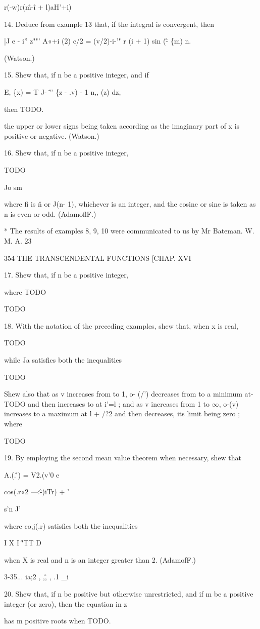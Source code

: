 r(-w)r(\^m-\^i + l)aH'+i)

14. Deduce from example 13 that, if the integral is convergent, then

|J e - i'' z""' A«+i (2) c/2 = (v/2)-i-'" r (i + 1) sin (\^ - \{m) n.

(Watson.)

15. Shew that, if n be a positive integer, and if

E, \{x) = T J- \^'' \{z - .v) - 1 n,, (z) dz,

then TODO.

the upper or lower signs being taken according as the imaginary part
of x is positive or negative. (Watson.)

16. Shew that, if n be a positive integer,

TODO

Jo sm

where fi is \^n or J(n- 1), whichever is an integer, and the cosine or
sine is taken as n is even or odd. (AdamoflF.)

* The results of examples 8, 9, 10 were communicated to us by Mr
Bateman. W. M. A. 23



354 THE TRANSCENDENTAL FUNCTIONS [CHAP. XVI

17. Shew that, if n be a positive integer,

where TODO

TODO 

18. With the notation of the preceding examples, shew that, when x is
real,

TODO

while Ja satisfies both the inequalities

TODO

Shew also that as v increases from to 1, o- (/') decreases from to a
minimum at- TODO and then increases to at i'=l ; and as v increases
from 1 to $\infty$, o-(v) increases to a maximum at l + /?2 and then
decreases, its limit being zero ; where

TODO 

19. By employing the second mean value theorem when necessary, shew
that



A.(.\^') = V2.(v'0 e



cos(.r«2 —:\^-)iTr) + '



s'n J'



where co,j(.r) satisfies both the inequalities

I X I \^'TT D

when X is real and n is an integer greater than 2. (AdamofF.)



3-35... ia;2 , ,\^, , .1 \_i



20. Shew that, if n be positive but otherwise unrestricted, and if m
be a positive integer (or zero), then the equation in z

has m positive roots when TODO. 